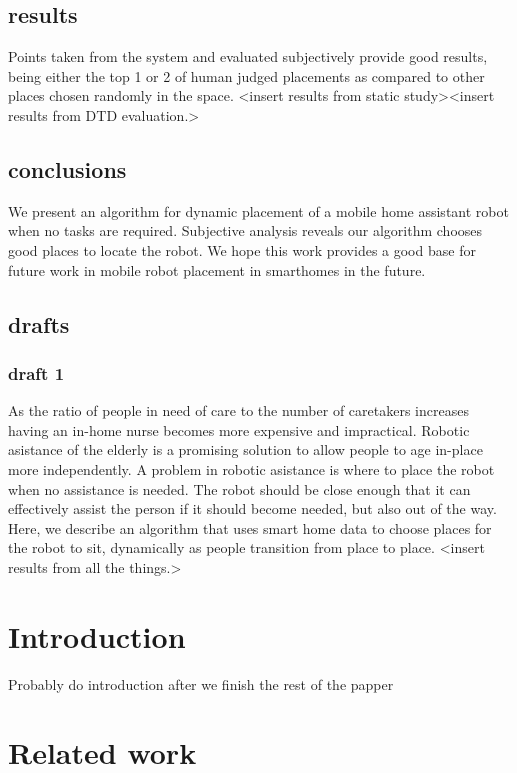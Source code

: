 \documentclass[11pt, conference, a4paper]{IEEEtran}
\begin{document}
\subsection{results}
Points taken from the system and evaluated subjectively provide good results, 
being either the top 1 or 2 of human judged placements as compared to other 
places chosen randomly in the space. \textless insert results from static 
study\textgreater \textless insert results from DTD evaluation.\textgreater

\subsection{conclusions}
We present an algorithm for dynamic placement of a mobile home assistant robot 
when no tasks are required. Subjective analysis reveals our algorithm chooses 
good places to locate the robot. We hope this work provides a good base for 
future work in mobile robot placement in smarthomes in the future.

\subsection{drafts}
\subsubsection{draft 1}
As the ratio of people in need of care to the number of caretakers increases 
having an in-home nurse becomes more expensive and impractical. Robotic 
asistance of the elderly is a promising solution to allow people to age 
in-place more independently. A problem in robotic asistance is where to place 
the robot when no assistance is needed. The robot should be close enough that 
it can effectively assist the person if it should become needed, but also out 
of the way. Here, we describe an algorithm that uses smart home data to choose 
places for the robot to sit, dynamically as people transition from place to 
place. \textless insert results from all the things.\textgreater


\section{Introduction}

Probably do introduction after we finish the rest of the papper

\section{Related work}
\end{document}
